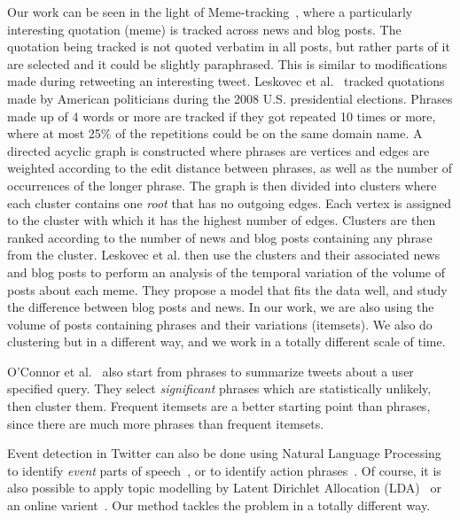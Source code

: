 \documentclass[letterpaper,12pt,titlepage,oneside,final]{book}
\begin{document}
Our work can be seen in the light of Meme-tracking~\cite{leskovec2009meme},
where a particularly interesting quotation (meme) is tracked across news and blog posts.
The quotation being tracked is not quoted verbatim in all posts, 
but rather parts of it are selected and it could be slightly paraphrased.
This is similar to modifications made during retweeting an interesting tweet.
Leskovec et al.~\cite{leskovec2009meme} tracked quotations made by
American politicians during the 2008 U.S. presidential elections.
Phrases made up of 4 words or more are tracked if they got repeated 10 times or more,
where at most 25\% of the repetitions could be on the same domain name.
A directed acyclic graph is constructed where phrases are vertices 
and edges are weighted according to the edit distance between phrases, 
as well as the number of occurrences of the longer phrase.
The graph is then divided into clusters where each cluster contains
one \emph{root} that has no outgoing edges. 
Each vertex is assigned to the cluster 
with which it has the highest number of edges.
Clusters are then ranked according to the number of news and blog posts 
containing any phrase from the cluster.
Leskovec et al. then use the clusters and their associated news and blog posts
to perform an analysis of the temporal variation of the volume of posts about
each meme.
They propose a model that fits the data well, 
and study the difference between blog posts and news.
In our work, we are also using the volume of posts 
containing phrases and their variations (itemsets).
We also do clustering but in a different way, 
and we work in a totally different scale of time.

O'Connor et al.~\cite{o2010tweetmotif} also start from phrases
to summarize tweets about a user specified query.
They select \emph{significant} phrases which
are statistically unlikely, then cluster them. 
Frequent itemsets are a better starting point than phrases,
since there are much more phrases than frequent itemsets.

Event detection in Twitter can also be done using 
Natural Language Processing
to identify \emph{event} parts of speech~\cite{ritter2012open},
or to identify action phrases~\cite{popescu2011extracting}.
Of course, it is also possible to apply topic modelling 
by Latent Dirichlet Allocation (LDA)~\cite{hong2010empirical}
or an online varient~\cite{hoffman2010online,yao2009efficient}.
Our method tackles the problem in a totally different way.

\end{document}
